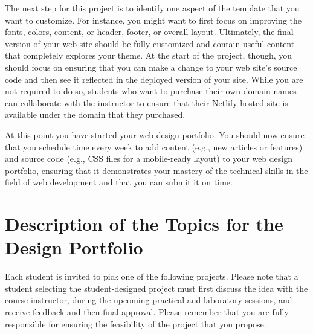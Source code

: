 \documentclass[11pt]{article}
\begin{document}
The next step for this project is to identify one aspect of the template that
you want to customize. For instance, you might want to first focus on improving
the fonts, colors, content, or header, footer, or overall layout. Ultimately,
the final version of your web site should be fully customized and contain useful
content that completely explores your theme. At the start of the project,
though, you should focus on ensuring that you can make a change to your web
site's source code and then see it reflected in the deployed version of your
site.
%
While you are not required to do so, students who want to purchase their own
domain names can collaborate with the instructor to ensure that their
Netlify-hosted site is available under the domain that they purchased.

At this point you have started your web design portfolio. You should now ensure
that you schedule time every week to add content (e.g., new articles or
features) and source code (e.g., CSS files for a mobile-ready layout) to your
web design portfolio, ensuring that it demonstrates your mastery of the
technical skills in the field of web development and that you can submit it on
time.

\section*{Description of the Topics for the Design Portfolio}

Each student is invited to pick one of the following projects. Please note that
a student selecting the student-designed project must first discuss the idea
with the course instructor, during the upcoming practical and laboratory
sessions, and receive feedback and then final approval.
%
Please remember that you are fully responsible for ensuring the feasibility of
the project that you propose.
\end{document}
